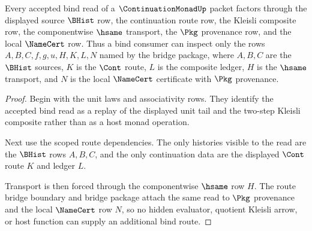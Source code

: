 \begin{theorem}
\label{thm:continuation-monad-bind-route-coverage}
Every accepted bind read of a $\ContinuationMonadUp$ packet factors through the displayed source $\BHist$ row, the continuation route row, the Kleisli composite row, the componentwise $\hsame$ transport, the $\Pkg$ provenance row, and the local $\NameCert$ row. Thus a bind consumer can inspect only the rows $A,B,C,f,g,u,H,K,L,N$ named by the bridge package, where $A,B,C$ are the $\BHist$ sources, $K$ is the $\Cont$ route, $L$ is the composite ledger, $H$ is the $\hsame$ transport, and $N$ is the local $\NameCert$ certificate with $\Pkg$ provenance.
\end{theorem}
\begin{proof}
Begin with the unit laws and associativity rows. They identify the accepted bind read as a replay of the displayed unit tail and the two-step Kleisli composite rather than as a host monad operation.

Next use the scoped route dependencies. The only histories visible to the read are the $\BHist$ rows $A,B,C$, and the only continuation data are the displayed $\Cont$ route $K$ and ledger $L$.

Transport is then forced through the componentwise $\hsame$ row $H$. The route bridge boundary and bridge package attach the same read to $\Pkg$ provenance and the local $\NameCert$ row $N$, so no hidden evaluator, quotient Kleisli arrow, or host function can supply an additional bind route.
\end{proof}

